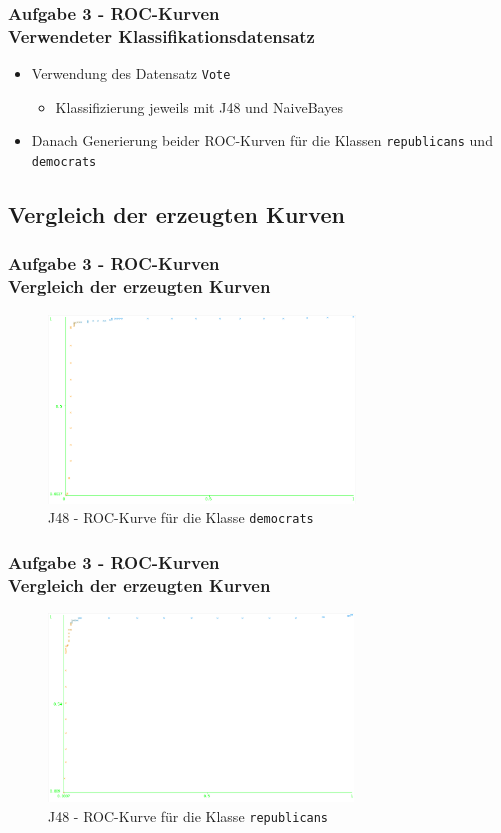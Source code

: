 \documentclass[accentcolor=tud6b,colorbacktitle,inverttitle,landscape,german,presentation,t]{tudbeamer}
\begin{document}
    \begin{frame}[t]
    \frametitle{Aufgabe 3 - ROC-Kurven\\ Verwendeter Klassifikationsdatensatz}
        \begin{itemize}
            \item Verwendung des Datensatz \texttt{Vote} 
            \begin{itemize}
         		\item  Klassifizierung jeweils mit J48 und NaiveBayes
	\end{itemize}           
            \item Danach Generierung beider ROC-Kurven für die Klassen \texttt{republicans} und \texttt{democrats} 
        \end{itemize}
    \end{frame}
    
    \subsection{Vergleich der erzeugten Kurven}
    
    \begin{frame}[t]
    \frametitle{Aufgabe 3 - ROC-Kurven\\ Vergleich der erzeugten Kurven}
        \begin{figure}[htbp]
            \centering
            \includegraphics[height=5cm]{roc-j48-democrats}
            \caption{J48 - ROC-Kurve für die Klasse \texttt{democrats}}
        \end{figure}
    \end{frame}
    
    \begin{frame}[t]
    \frametitle{Aufgabe 3 - ROC-Kurven\\ Vergleich der erzeugten Kurven}
        \begin{figure}[htbp]
            \centering
            \includegraphics[height=5cm]{roc-j48-republicans}
            \caption{J48 - ROC-Kurve für die Klasse \texttt{republicans}}
        \end{figure}
    \end{frame}
    
\end{document}
